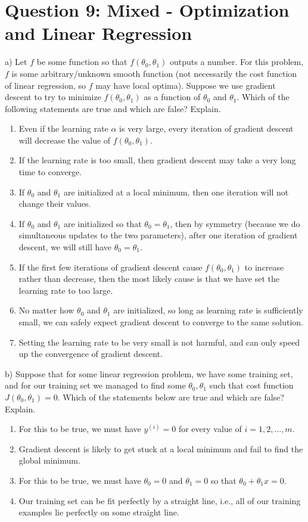 \documentclass[12pt]{article}
\begin{document}
	\section*{Question 9: Mixed - Optimization and Linear Regression \cite{q3}}
	a) Let $f$ be some function so that $f(\theta_0,\theta_1)$ outputs a number. For this problem, $f$ is some arbitrary/unknown smooth function (not necessarily the cost function of linear regression, so $f$ may have local optima). Suppose we use gradient descent to try to minimize $f(\theta_0,\theta_1)$ as a function of $\theta_0$ and $\theta_1$. Which of the following statements are true and which are false? Explain.
	\begin{enumerate}
		\item Even if the learning rate $\alpha$ is very large, every iteration of gradient descent will decrease the value of $f(\theta_0,\theta_1)$.
		\item If the learning rate is too small, then gradient descent may take a very long time to converge.
		\item If $\theta_0$ and $\theta_1$ are initialized at a local minimum, then one iteration will not change their values.
		\item If $\theta_0$ and $\theta_1$ are initialized so that $\theta_0=\theta_1$, then by symmetry (because we do simultaneous updates to the two parameters), after one iteration of gradient descent, we will still have $\theta_0=\theta_1$.
		\item If the first few iterations of gradient descent cause $f(\theta_0,\theta_1)$ to increase rather than decrease, then the most likely cause is that we have set the learning rate to too large.
		\item No matter how $\theta_0$ and $\theta_1$ are initialized, so long as learning rate is sufficiently small, we can safely expect gradient descent to converge to the same solution.
		\item Setting the learning rate to be very small is not harmful, and can only speed up the convergence of gradient descent.
	\end{enumerate}
	
	b) Suppose that for some linear regression problem, we have some training set, and for our training set we managed to find some $\theta_0, \theta_1$ such that cost function $J(\theta_0,\theta_1)=0$. Which of the statements below are true and which are false? Explain.
	\begin{enumerate}
		\item For this to be true, we must have $y^{(i)}=0$ for every value of $i=1,2,\dots,m$.
		\item Gradient descent is likely to get stuck at a local minimum and fail to find the global minimum.
		\item For this to be true, we must have $\theta_0=0$ and $\theta_1=0$ so that $\theta_0 + \theta_1x=0$.
		\item Our training set can be fit perfectly by a straight line, i.e., all of our training examples lie perfectly on some straight line.
	\end{enumerate}
	
\end{document}
